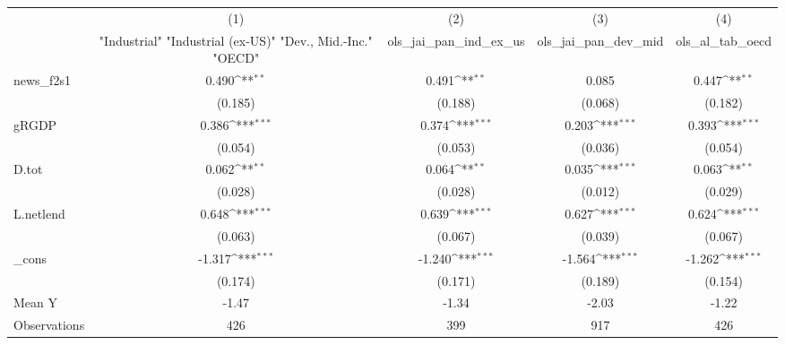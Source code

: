 {
\def\sym#1{\ifmmode^{#1}\else\(^{#1}\)\fi}
\begin{tabular}{l*{4}{c}}
\toprule
            &\multicolumn{1}{c}{(1)}&\multicolumn{1}{c}{(2)}&\multicolumn{1}{c}{(3)}&\multicolumn{1}{c}{(4)}\\
            &\multicolumn{1}{c}{ "Industrial" "Industrial (ex-US)" "Dev., Mid.-Inc." "OECD" }&\multicolumn{1}{c}{ols\_jai\_pan\_ind\_ex\_us}&\multicolumn{1}{c}{ols\_jai\_pan\_dev\_mid}&\multicolumn{1}{c}{ols\_al\_tab\_oecd}\\
\midrule
news\_f2s1   &       0.490\sym{**} &       0.491\sym{**} &       0.085         &       0.447\sym{**} \\
            &     (0.185)         &     (0.188)         &     (0.068)         &     (0.182)         \\
\addlinespace
gRGDP       &       0.386\sym{***}&       0.374\sym{***}&       0.203\sym{***}&       0.393\sym{***}\\
            &     (0.054)         &     (0.053)         &     (0.036)         &     (0.054)         \\
\addlinespace
D.tot       &       0.062\sym{**} &       0.064\sym{**} &       0.035\sym{***}&       0.063\sym{**} \\
            &     (0.028)         &     (0.028)         &     (0.012)         &     (0.029)         \\
\addlinespace
L.netlend   &       0.648\sym{***}&       0.639\sym{***}&       0.627\sym{***}&       0.624\sym{***}\\
            &     (0.063)         &     (0.067)         &     (0.039)         &     (0.067)         \\
\addlinespace
\_cons      &      -1.317\sym{***}&      -1.240\sym{***}&      -1.564\sym{***}&      -1.262\sym{***}\\
            &     (0.174)         &     (0.171)         &     (0.189)         &     (0.154)         \\
\midrule
Mean Y      &       -1.47         &       -1.34         &       -2.03         &       -1.22         \\
Observations&         426         &         399         &         917         &         426         \\
\bottomrule
\end{tabular}
}
